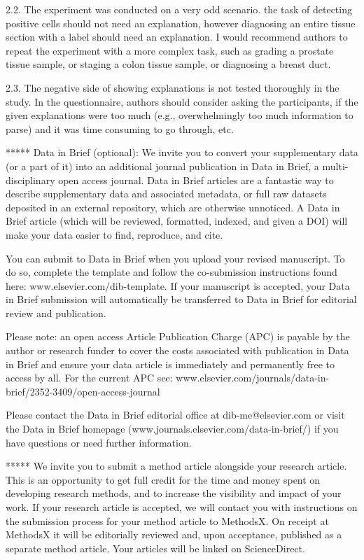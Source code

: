2.2. The experiment was conducted on a very odd scenario. the task of detecting positive cells should not need an explanation, however diagnosing an entire tissue section with a label should need an explanation.
I would recommend authors to repeat the experiment with a more complex task, such as grading a prostate tissue sample, or staging a colon tissue sample, or diagnosing a breast duct.

2.3. The negative side of showing explanations is not tested thoroughly in the study. In the questionnaire, authors should consider asking the participants, if the given explanations were too much (e.g., overwhelmingly too much information to parse) and it was time consuming to go through, etc.
 

 

*****
Data in Brief (optional):
We invite you to convert your supplementary data (or a part of it) into an additional journal publication in Data in Brief, a multi-disciplinary open access journal. Data in Brief articles are a fantastic way to describe supplementary data and associated metadata, or full raw datasets deposited in an external repository, which are otherwise unnoticed. A Data in Brief article (which will be reviewed, formatted, indexed, and given a DOI) will make your data easier to find, reproduce, and cite.
 
You can submit to Data in Brief when you upload your revised manuscript. To do so, complete the template and follow the co-submission instructions found here: www.elsevier.com/dib-template. If your manuscript is accepted, your Data in Brief submission will automatically be transferred to Data in Brief for editorial review and publication.
 
Please note: an open access Article Publication Charge (APC) is payable by the author or research funder to cover the costs associated with publication in Data in Brief and ensure your data article is immediately and permanently free to access by all. For the current APC see: www.elsevier.com/journals/data-in-brief/2352-3409/open-access-journal
 
Please contact the Data in Brief editorial office at dib-me@elsevier.com or visit the Data in Brief homepage (www.journals.elsevier.com/data-in-brief/) if you have questions or need further information.


*****
We invite you to submit a method article alongside your research article. This is an opportunity to get full credit for the time and money spent on developing research methods, and to increase the visibility and impact of your work. If your research article is accepted, we will contact you with instructions on the submission process for your method article to MethodsX. On receipt at MethodsX it will be editorially reviewed and, upon acceptance, published as a separate method article. Your articles will be linked on ScienceDirect.

